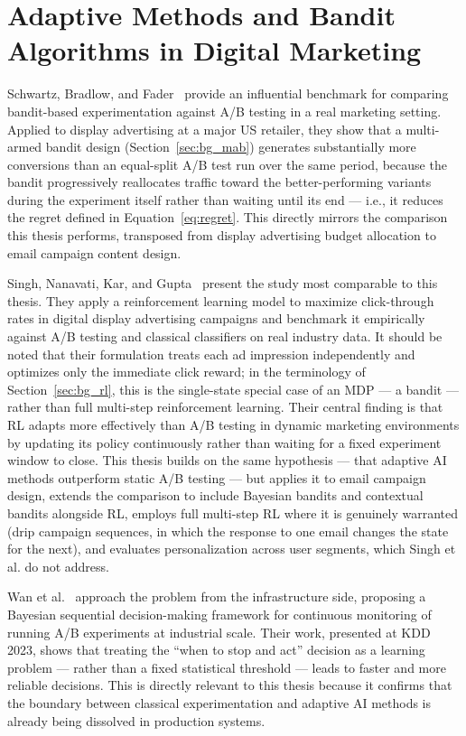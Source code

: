 \section{Adaptive Methods and Bandit Algorithms in Digital Marketing}

Schwartz, Bradlow, and Fader~\cite{schwartz2017customer} provide an influential benchmark for comparing bandit-based experimentation against A/B testing in a real marketing setting. Applied to display advertising at a major US retailer, they show that a multi-armed bandit design (Section~\ref{sec:bg_mab}) generates substantially more conversions than an equal-split A/B test run over the same period, because the bandit progressively reallocates traffic toward the better-performing variants during the experiment itself rather than waiting until its end --- i.e., it reduces the regret defined in Equation~\eqref{eq:regret}. This directly mirrors the comparison this thesis performs, transposed from display advertising budget allocation to email campaign content design.

Singh, Nanavati, Kar, and Gupta~\cite{singh2023maximize} present the study most comparable to this thesis. They apply a reinforcement learning model to maximize click-through rates in digital display advertising campaigns and benchmark it empirically against A/B testing and classical classifiers on real industry data. It should be noted that their formulation treats each ad impression independently and optimizes only the immediate click reward; in the terminology of Section~\ref{sec:bg_rl}, this is the single-state special case of an MDP --- a bandit --- rather than full multi-step reinforcement learning. Their central finding is that RL adapts more effectively than A/B testing in dynamic marketing environments by updating its policy continuously rather than waiting for a fixed experiment window to close. This thesis builds on the same hypothesis --- that adaptive AI methods outperform static A/B testing --- but applies it to email campaign design, extends the comparison to include Bayesian bandits and contextual bandits alongside RL, employs full multi-step RL where it is genuinely warranted (drip campaign sequences, in which the response to one email changes the state for the next), and evaluates personalization across user segments, which Singh et al. do not address.

Wan et al.~\cite{wan2023bayesian} approach the problem from the infrastructure side, proposing a Bayesian sequential decision-making framework for continuous monitoring of running A/B experiments at industrial scale. Their work, presented at KDD 2023, shows that treating the ``when to stop and act'' decision as a learning problem --- rather than a fixed statistical threshold --- leads to faster and more reliable decisions. This is directly relevant to this thesis because it confirms that the boundary between classical experimentation and adaptive AI methods is already being dissolved in production systems.

